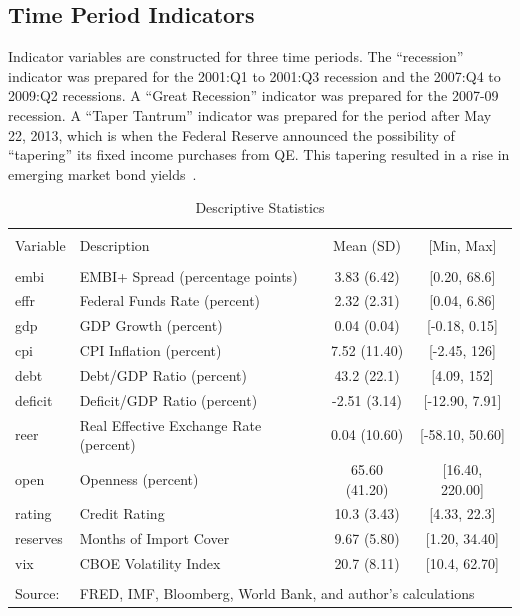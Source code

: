 \documentclass[12pt]{article}
\begin{document}
\subsection{Time Period Indicators}
Indicator variables are constructed for three time periods. The ``recession'' indicator was prepared for the 2001:Q1 to 2001:Q3 recession and the 2007:Q4 to 2009:Q2 recessions. A ``Great Recession'' indicator was prepared for the 2007-09 recession. A ``Taper Tantrum'' indicator was prepared for the period after May 22, 2013, which is when the Federal Reserve announced the possibility of ``tapering'' its fixed income purchases from QE. This tapering resulted in a rise in emerging market bond yields~\parencite{klemm14}.
%
\begin{table}[!htbp]
\scriptsize
\centering
\caption{Descriptive Statistics}
    \label{tbl1}
\begin{tabular}{@{\extracolsep{5pt}}llcc} 
\\[-1.8ex]\hline \hline\\[-1.8ex] 
Variable & Description & Mean (SD) & [Min, Max]\\ 
\hline\\
[-1.8ex] embi & EMBI+ Spread (percentage points) & 3.83 (6.42) & [0.20, 68.6]\\
effr & Federal Funds Rate (percent) & 2.32 (2.31) & [0.04, 6.86]\\
gdp & GDP Growth (percent) & 0.04 (0.04) & [-0.18, 0.15]\\
cpi & CPI Inflation (percent) & 7.52 (11.40) & [-2.45, 126]\\
debt & Debt/GDP Ratio (percent) & 43.2 (22.1) & [4.09, 152]\\
deficit & Deficit/GDP Ratio (percent) & -2.51 (3.14) & [-12.90, 7.91]\\
reer & Real Effective Exchange Rate (percent) & 0.04 (10.60) & [-58.10, 50.60]\\
open & Openness (percent) & 65.60 (41.20) & [16.40, 220.00]\\
rating & Credit Rating & 10.3 (3.43) & [4.33, 22.3]\\
reserves & Months of Import Cover & 9.67 (5.80) & [1.20, 34.40]\\
vix & CBOE Volatility Index & 20.7 (8.11) & [10.4, 62.70]\\
\hline \hline \\[-1.8ex] 
Source:  & \multicolumn{3}{l}{FRED, IMF, Bloomberg, World Bank, and author's calculations} \\ 
\end{tabular} 
\end{table} 
\end{document}
